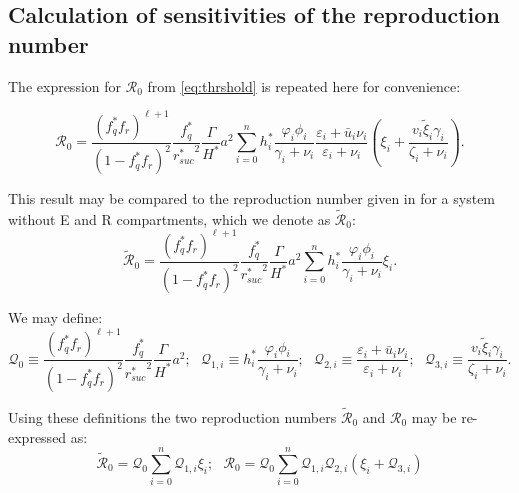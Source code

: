 \documentclass[a4paper]{article}
\newcommand{\varpiVar}{r_{suc}}
\begin{document}
\subsection{Calculation of sensitivities of the reproduction number }

The expression for $\mathcal{R}_0$ from \eqref{eq:thrshold} is repeated here for convenience:

\begin{equation}\label{eq:thrshold1}
\mathcal{R}_0 =
\frac{({f_q^*}f_r)^{\ell+1}}{(1-f_q^*f_r)^2}\dfrac{f_q^*}{{\varpiVar ^*}^2}\dfrac{\Gamma}{H^*}a^2\sum_{i=0}^nh_i^*\frac{\varphi_i\phi_i}{\gamma_i+\nu_i}\frac{\varepsilon_i+\bar u_i\nu_i }{\varepsilon_i+\nu_i}\left(\xi_{i}+\frac{v_i\widetilde \xi_{i}\gamma_i}{\zeta_i+\nu_i}\right).
\end{equation}

This result may be compared to the reproduction number given in \cite{jck-19} for a system without E and R compartments, which we denote as $\widetilde{\mathcal{R}}_0$:
\begin{equation}\label{eq:thrshold_old}
\widetilde{\mathcal{R}}_0 =
\frac{({f_q^*}f_r)^{\ell+1}}{(1-f_q^*f_r)^2}\dfrac{f_q^*}{{\varpiVar ^*}^2}\dfrac{\Gamma}{H^*}a^2\sum_{i=0}^nh_i^*\frac{\varphi_i\phi_i}{\gamma_i+\nu_i}\xi_{i}.
\end{equation}

We may define:
\begin{equation}
\mathcal{Q}_0 \equiv  \frac{({f_q^*}f_r)^{\ell+1}}{(1-f_q^*f_r)^2}\dfrac{f_q^*}{{\varpiVar ^*}^2}\dfrac{\Gamma}{H^*}a^2; ~~~
\mathcal{Q}_{1,i} \equiv h_i^*\frac{\varphi_i\phi_i}{\gamma_i+\nu_i};~~~
\mathcal{Q}_{2,i} \equiv \frac{\varepsilon_i+\bar u_i\nu_i }{\varepsilon_i+\nu_i};~~~
\mathcal{Q}_{3,i} \equiv \frac{v_i\widetilde \xi_{i}\gamma_i}{\zeta_i+\nu_i}.
\end{equation}

Using these definitions the two reproduction numbers $\widetilde{\mathcal{R}}_0$ and $\mathcal{R}_0$ may be re-expressed as:
\begin{equation}
\widetilde{\mathcal{R}}_0 = \mathcal{Q}_0 \sum_{i=0}^n \mathcal{Q}_{1,i} \xi_i ; ~~~
\mathcal{R}_0 = \mathcal{Q}_0 \sum_{i=0}^n \mathcal{Q}_{1,i} \mathcal{Q}_{2,i} \left(\xi_i + \mathcal{Q}_{3,i} \right)
\end{equation} 
\end{document}
